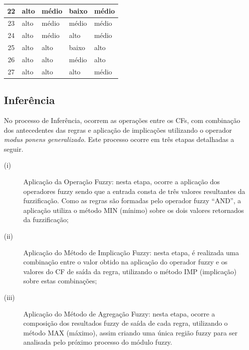 \documentclass[tcc,capa]{texufpel}
\begin{document}
\begin{table}[h]
\begin{tabular}{|c||l|l|l|l|}
22 &      alto         &     médio    &    baixo     &   médio    \\ \hline
23 &      alto         &     médio    &    médio   &   médio    \\ \hline
24 &      alto         &     médio    &      alto     &   médio    \\ \hline
25 &      alto         &       alto      &    baixo     &   alto    \\ \hline
26 &      alto         &       alto      &    médio   &   alto        \\ \hline
27 &      alto         &       alto      &      alto     &   médio  \\ \hline
\end{tabular}
\label{lblBaseRegras}
\end{table}

\newpage

\subsection{Inferência}\label{inf}

No processo de Inferência, ocorrem as operações entre os CFs, com combinação dos antecedentes das regras e  aplicação de implicações utilizando o operador \textit{modus ponens generalizado}. Este processo ocorre em três etapas detalhadas a seguir. 


\begin{description}
	\item [(i)] Aplicação da Operação Fuzzy: nesta etapa, ocorre a aplicação dos operadores fuzzy sendo que a entrada consta de três valores resultantes da fuzzificação. Como as regras são formadas pelo operador fuzzy ``AND'', a aplicação utiliza o método MIN (mínimo) sobre os dois valores retornados da fuzzificação;
	\item [(ii)] Aplicação do Método de Implicação Fuzzy: nesta etapa, é realizada uma combinação entre o valor obtido na aplicação do operador fuzzy e os valores do CF de saída da regra, utilizando o método IMP (implicação) sobre estas combinações;
	\item [(iii)] Aplicação do Método de Agregação Fuzzy: nesta etapa, ocorre a composição dos resultados fuzzy de saída de cada regra, utilizando o método MAX (máximo), assim criando uma única região fuzzy para ser analisada pelo próximo processo do módulo fuzzy.
\end{description}
\end{document}
